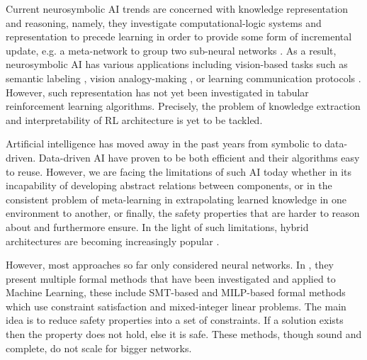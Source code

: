 \documentclass[a4paper,11pt]{article}
\begin{document}
\medskip

Current neurosymbolic AI trends are concerned with knowledge representation and reasoning, namely, they investigate computational-logic systems 
and representation to precede learning in order to provide some form of incremental update, e.g. a meta-network to group two sub-neural networks \cite{Besold2017NeuralSymbolicLA}.
As a result, neurosymbolic AI has various applications including vision-based tasks such as semantic labeling \cite{vinyals2015, karpathy2015}, 
vision analogy-making \cite{Reed2015DeepVA}, or learning communication protocols \cite{Foerster2016LearningTC}.
However, such representation has not yet been investigated in tabular reinforcement learning algorithms. Precisely, the problem of knowledge extraction and interpretability of RL architecture is yet to be tackled.

\medskip

Artificial intelligence has moved away in the past years from symbolic to data-driven. 
Data-driven AI have proven to be both efficient and their algorithms easy to reuse. However, 
we are facing the limitations of such AI today whether 
in its incapability of developing abstract relations between components, or in the consistent problem of meta-learning in extrapolating learned knowledge 
in one environment to another, or finally, the safety properties that are harder to reason about and furthermore ensure. 
In the light of such limitations, hybrid architectures are becoming increasingly popular \cite{garcez2020neurosymbolic}. 

\medskip

However, most approaches so far only considered neural networks. In \cite{urban2021}, they present multiple formal methods that have been investigated 
and applied to Machine Learning, these include SMT-based and MILP-based formal methods which use constraint satisfaction and mixed-integer linear problems. The main idea is to reduce safety properties into a set of 
constraints. If a solution exists then the property does not hold, else it is safe. 
These methods, though sound and complete, do not scale for bigger networks.

\medskip
\end{document}

